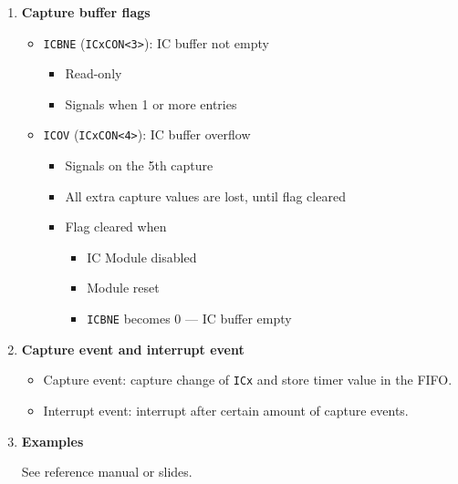\documentclass[a4paper]{article}
\begin{document}
\begin{enumerate}[label = \arabic*.]
		\item \textbf{Capture buffer flags}
			\begin{itemize}[leftmargin = 1cm]
				\item \verb|ICBNE| (\verb|ICxCON<3>|): IC buffer not empty
					\begin{itemize}[leftmargin = 1cm]
						\item Read-only
						\item Signals when 1 or more entries
					\end{itemize}
				\item \verb|ICOV| (\verb|ICxCON<4>|): IC buffer overflow
					\begin{itemize}[leftmargin = 1cm]
						\item Signals on the 5th capture
						\item All extra capture values are lost, until flag cleared
						\item Flag cleared when
							\begin{itemize}[leftmargin = 1cm]
								\item IC Module disabled
								\item Module reset
								\item \verb|ICBNE| becomes 0 --- IC buffer empty
							\end{itemize}
					\end{itemize}
			\end{itemize}


		\item \textbf{Capture event and interrupt event}
			\begin{itemize}[leftmargin = 1cm]
				\item Capture event: capture change of \verb|ICx| and store timer value in the FIFO\@.
				\item Interrupt event: interrupt after certain amount of capture events.
			\end{itemize}

		\item \textbf{Examples}
			\par See reference manual or slides.
	\end{enumerate}
\end{document}

